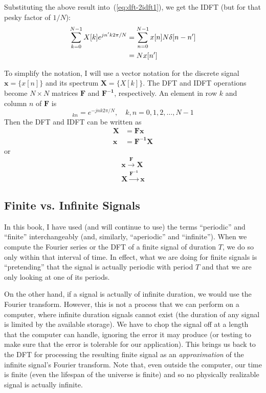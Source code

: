 Substituting the above result into~(\ref{eq:dft-2idft1}), we get the
IDFT (but for that pesky factor of $1/N$):
\begin{align}
\sum_{k=0}^{N-1}X[k] e^{j n' k 2\pi/N}
  &= \sum_{n=0}^{N-1}x[n] N\delta[n-n'] \notag\\
  &= Nx[n']
\end{align}

To simplify the notation, I will use a vector notation for the
discrete signal $\mathbf{x}=\{x[n]\}$ and its spectrum
$\mathbf{X}=\{X[k]\}$.  The DFT and IDFT operations become $N\times N$
matrices $\mathbf{F}$ and $\mathbf{F^{-1}}$, respectively. An element
in row $k$ and column $n$ of $\mathbf{F}$ is
\begin{equation}
[\mathbf{F}]_{kn}= e^{-jnk2\pi/N}, \quad k,n=0,1,2,\ldots,N-1
\end{equation}
Then the DFT and IDFT can be written as
\begin{align}
\mathbf{X} &= \mathbf{F}\mathbf{x}\\
\mathbf{x} &= \mathbf{F^{-1}}\mathbf{X}
\end{align}
or 
\begin{gather}
\mathbf{x}\stackrel{\mathbf{F}}{\longrightarrow} \mathbf{X}\\
\mathbf{X}\stackrel{\mathbf{F^{-1}}}{\longrightarrow} \mathbf{x}
\end{gather}

\subsection{Finite vs. Infinite Signals}

In this book, I have used (and will continue to use) the terms
``periodic'' and ``finite'' interchangeably (and, similarly,
``aperiodic'' and ``infinite''). When we compute the Fourier series or
the DFT of a finite signal of duration $T$, we do so only within that
interval of time. In effect, what we are doing for finite signals is
``pretending'' that the signal is actually periodic with period $T$
and that we are only looking at one of its periods.

On the other hand, if a signal is actually of infinite duration, we
would use the Fourier transform. However, this is not a process that
we can perform on a computer, where infinite duration signals cannot
exist (the duration of any signal is limited by the available
storage). We have to chop the signal off at a length that the computer
can handle, ignoring the error it may produce (or testing to make sure
that the error is tolerable for our application). This brings us back
to the DFT for processing the resulting finite signal as an
\emph{approximation} of the infinite signal's Fourier transform. Note
that, even outside the computer, our time is finite (even the lifespan
of the universe is finite) and so no physically realizable signal is
actually infinite.


